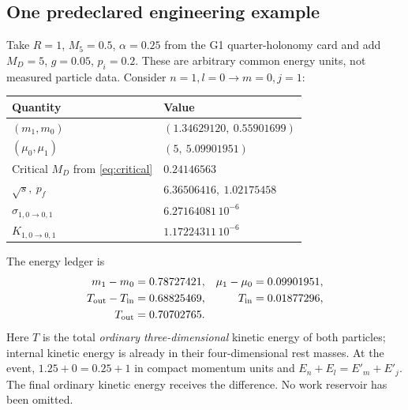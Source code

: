 \documentclass[11pt,a4paper]{article}
\begin{document}
\subsection*{One predeclared engineering example}
Take $R=1$, $M_5=0.5$, $\alpha=0.25$ from the G1 quarter-holonomy
card and add $M_D=5$, $g=0.05$, $p_i=0.2$. These are arbitrary
common energy units, not measured particle data. Consider
$n=1,l=0\to m=0,j=1$:
\begin{center}
\begin{tabular}{ll}
\toprule
Quantity & Value\\
\midrule
$(m_1,m_0)$ & $(1.34629120,\ 0.55901699)$\\
$(\mu_0,\mu_1)$ & $(5,\ 5.09901951)$\\
Critical $M_D$ from \eqref{eq:critical} & $0.24146563$\\
$\sqrt s,\ p_f$ & $6.36506416,\ 1.02175458$\\
$\sigma_{1,0\to0,1}$ & $6.27164081\,10^{-6}$\\
$K_{1,0\to0,1}$ & $1.17224311\,10^{-6}$\\
\bottomrule
\end{tabular}
\end{center}
The energy ledger is
\begin{align}
 m_1-m_0&=0.78727421,& \mu_1-\mu_0&=0.09901951,\\
 T_{\rm out}-T_{\rm in}
 &=0.68825469,& T_{\rm in}&=0.01877296,\\
 T_{\rm out}&=0.70702765.&
\end{align}
Here $T$ is the total \emph{ordinary three-dimensional} kinetic energy
of both particles; internal kinetic energy is already in their
four-dimensional rest masses. At the event,
$1.25+0=0.25+1$ in compact momentum units and
$E_n+E_l=E'_m+E'_j$. The final ordinary kinetic energy receives
the difference. No work reservoir has been omitted.
\end{document}
